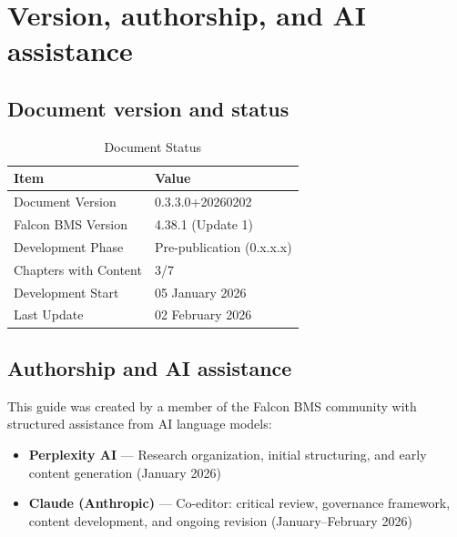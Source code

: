 \documentclass[11pt, a4paper, twoside]{report}
\newcommand{\docversion}{0.3.3.0}
\newcommand{\docbuild}{20260202}
\newcommand{\docstartdate}{05 January 2026}
\newcommand{\docenddate}{02 February 2026}
\newcommand{\chapterscompletedof}{3/7}
\newcommand{\fulldocversion}{\docversion+\docbuild}
\begin{document}
\section{Version, authorship, and AI assistance}
\label{sec:C1-S4}

\subsection{Document version and status}
\label{sec:C1-S4-S1}

\begin{table}[H]
	\centering
	\caption{Document Status}
	\label{tab:C1-doc-status}
	\small
	\renewcommand{\arraystretch}{1.25}
	\begin{tabular}{L{4.5cm} L{9.0cm}}
		\toprule
		\textbf{Item} & \textbf{Value} \\
		\midrule
		Document Version & \fulldocversion \\
		Falcon BMS Version & 4.38.1 (Update 1) \\
		Development Phase & Pre-publication (0.x.x.x) \\
		Chapters with Content & \chapterscompletedof \\
		Development Start & \docstartdate \\
		Last Update & \docenddate \\
		\bottomrule
	\end{tabular}
\end{table}

\subsection{Authorship and AI assistance}
\label{sec:C1-S4-S2}

This guide was created by a member of the Falcon BMS community with structured assistance from AI language models:

\begin{itemize}
	\item \textbf{Perplexity AI} --- Research organization, initial structuring, and early content generation (January 2026)
	\item \textbf{Claude (Anthropic)} --- Co-editor: critical review, governance framework, content development, and ongoing revision (January--February 2026)
\end{itemize}
\end{document}
